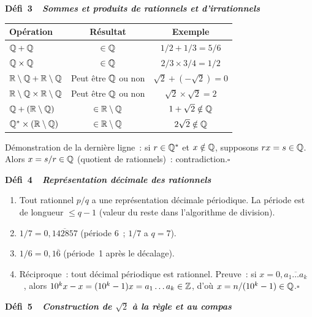\noindent{}
{\color{BO}\bfseries\small D\'efi~3~\textendash\ \textit{Sommes et produits de rationnels et d'irrationnels}}
\par\smallskip

\begin{center}
\renewcommand{\arraystretch}{1.4}
\begin{tabular}{|l|c|c|}
\hline
\rowcolor{BN!10}
Op\'eration & R\'esultat & Exemple \\
\hline
$\mathbb{Q}+\mathbb{Q}$ & $\in\mathbb{Q}$ & $1/2+1/3=5/6$ \\
$\mathbb{Q}\times\mathbb{Q}$ & $\in\mathbb{Q}$ & $2/3\times3/4=1/2$ \\
$\mathbb{R}\setminus\mathbb{Q}+\mathbb{R}\setminus\mathbb{Q}$ & Peut \^etre $\mathbb{Q}$ ou non & $\sqrt{2}+(-\sqrt{2})=0$ \\
$\mathbb{R}\setminus\mathbb{Q}\times\mathbb{R}\setminus\mathbb{Q}$ & Peut \^etre $\mathbb{Q}$ ou non & $\sqrt{2}\times\sqrt{2}=2$ \\
$\mathbb{Q}+(\mathbb{R}\setminus\mathbb{Q})$ & $\in\mathbb{R}\setminus\mathbb{Q}$ & $1+\sqrt{2}\notin\mathbb{Q}$ \\
$\mathbb{Q}^*\times(\mathbb{R}\setminus\mathbb{Q})$ & $\in\mathbb{R}\setminus\mathbb{Q}$ & $2\sqrt{2}\notin\mathbb{Q}$ \\
\hline
\end{tabular}
\end{center}

D\'emonstration de la derni\`ere ligne~: si $r\in\mathbb{Q}^*$ et $x\notin\mathbb{Q}$,
supposons $rx=s\in\mathbb{Q}$. Alors $x=s/r\in\mathbb{Q}$ (quotient de rationnels)~:
contradiction.\hfill$\square$

\noindent{}
{\color{BO}\bfseries\small D\'efi~4~\textendash\ \textit{Repr\'esentation d\'ecimale des rationnels}}
\par\smallskip

\begin{enumerate}
  \item Tout rationnel $p/q$ a une repr\'esentation d\'ecimale p\'eriodique.
        La p\'eriode est de longueur $\leq q-1$ (valeur du reste dans l'algorithme de division).
  \item $1/7=0{,}\overline{142857}$ (p\'eriode $6$~; $1/7$ a $q=7$).
  \item $1/6=0{,}1\overline{6}$ (p\'eriode~1 apr\`es le d\'ecalage).
  \item R\'eciproque~: tout d\'ecimal p\'eriodique est rationnel.
        Preuve~: si $x=0{,}\overline{a_1\ldots a_k}$~, alors $10^k x-x=(10^k-1)x=a_1\ldots a_k\in\mathbb{Z}$,
        d'o\`u $x=n/(10^k-1)\in\mathbb{Q}$.\hfill$\square$
\end{enumerate}

\noindent{}
{\color{BO}\bfseries\small D\'efi~5~\textendash\ \textit{Construction de $\sqrt{2}$ \`a la r\`egle et au compas}}
\par\smallskip


